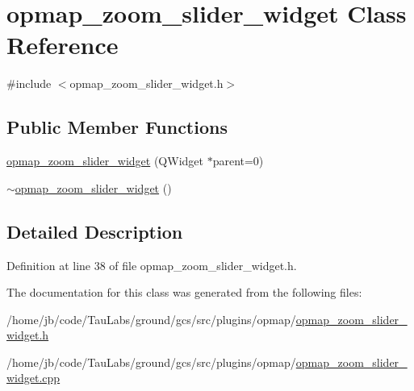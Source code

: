 \hypertarget{classopmap__zoom__slider__widget}{\section{opmap\-\_\-zoom\-\_\-slider\-\_\-widget \-Class \-Reference}
\label{classopmap__zoom__slider__widget}
}


{\ttfamily \#include $<$opmap\-\_\-zoom\-\_\-slider\-\_\-widget.\-h$>$}

\subsection*{\-Public \-Member \-Functions}
\begin{DoxyCompactItemize}
\item 
\hyperlink{group___o_p_map_plugin_ga95e119b3d479e4740f8231bef84b59ac}{opmap\-\_\-zoom\-\_\-slider\-\_\-widget} (\-Q\-Widget $\ast$parent=0)
\item 
\hyperlink{group___o_p_map_plugin_gab379eba250616b76de62dd392fa0e14d}{$\sim$opmap\-\_\-zoom\-\_\-slider\-\_\-widget} ()
\end{DoxyCompactItemize}


\subsection{\-Detailed \-Description}


\-Definition at line 38 of file opmap\-\_\-zoom\-\_\-slider\-\_\-widget.\-h.



\-The documentation for this class was generated from the following files\-:\begin{DoxyCompactItemize}
\item 
/home/jb/code/\-Tau\-Labs/ground/gcs/src/plugins/opmap/\hyperlink{opmap__zoom__slider__widget_8h}{opmap\-\_\-zoom\-\_\-slider\-\_\-widget.\-h}\item 
/home/jb/code/\-Tau\-Labs/ground/gcs/src/plugins/opmap/\hyperlink{opmap__zoom__slider__widget_8cpp}{opmap\-\_\-zoom\-\_\-slider\-\_\-widget.\-cpp}\end{DoxyCompactItemize}
